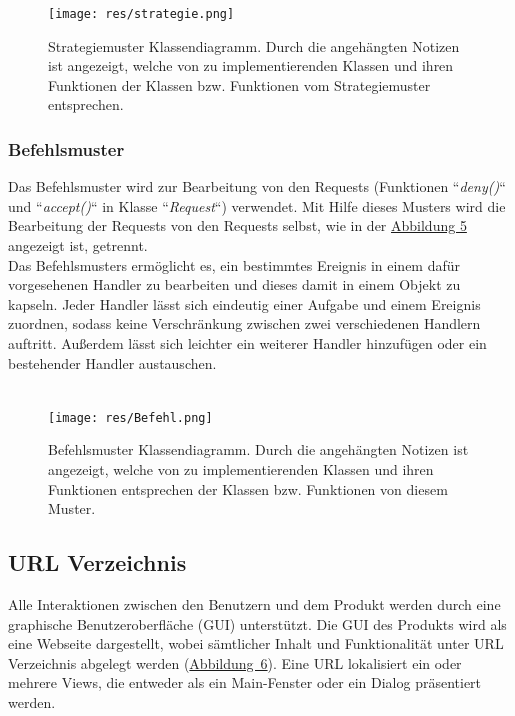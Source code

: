 \documentclass[parskip=full,11pt]{scrartcl}
\begin{document}
 \begin{figure}[ht!]
 	\centering
 	\texttt{[image: res/strategie.png]}
 	\caption{Strategiemuster Klassendiagramm. Durch die angehängten Notizen ist angezeigt, welche von zu implementierenden Klassen und ihren Funktionen der Klassen bzw. Funktionen vom Strategiemuster entsprechen. }
 \end{figure}
 
 \newpage
 \subsubsection*{Befehlsmuster}


Das Befehlsmuster wird zur Bearbeitung von den Requests (Funktionen ``\textit{deny()}`` und ``\textit{accept()}`` in Klasse ``\textit{Request}``) verwendet. Mit Hilfe dieses Musters wird die Bearbeitung der Requests von den Requests selbst, wie in der   \hyperref[Befehl]{Abbildung 5} angezeigt ist, getrennt.\\
 Das Befehlsmusters ermöglicht es, ein bestimmtes Ereignis in einem dafür vorgesehenen Handler zu bearbeiten und dieses damit in einem Objekt zu kapseln. Jeder Handler lässt sich eindeutig einer Aufgabe und einem Ereignis zuordnen, sodass keine Verschränkung zwischen zwei verschiedenen Handlern auftritt. Außerdem lässt sich leichter ein weiterer Handler hinzufügen oder ein bestehender Handler austauschen. \\\\
 
  \begin{figure}[ht!]
 	\centering
 	\texttt{[image: res/Befehl.png]}
 	\caption{Befehlsmuster Klassendiagramm. Durch die angehängten Notizen ist angezeigt, welche von zu implementierenden Klassen und ihren Funktionen entsprechen der Klassen bzw. Funktionen von diesem Muster.}
 	\label{Befehl}
 \end{figure}

\newpage
  \subsection{URL Verzeichnis}
Alle Interaktionen zwischen den Benutzern und dem Produkt werden durch eine graphische Benutzeroberfläche (GUI) unterstützt. Die \gls{GUI} des Produkts wird als eine Webseite dargestellt, wobei sämtlicher Inhalt und Funktionalität unter URL Verzeichnis abgelegt werden (\hyperref[URL Struktur]{\mbox{Abbildung 6}}). Eine URL lokalisiert ein oder mehrere Views, die entweder als ein Main-Fenster oder ein Dialog präsentiert werden.  
\end{document}
